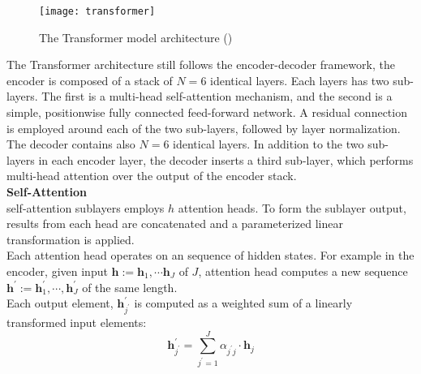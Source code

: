 \begin{figure}[t]
	\centering
	\texttt{[image: transformer]}
	\caption{The Transformer model architecture (\cite{vaswani2017attention})}
\end{figure}
The Transformer architecture still follows the encoder-decoder framework, the encoder is composed of a stack of $N=6$ identical layers. Each layers has two sub-layers. The first is a multi-head self-attention mechanism, and the second is a simple, positionwise fully connected feed-forward network. A residual connection is employed around each of the two sub-layers, followed by layer normalization. The decoder contains also $N=6$ identical layers. In addition to the two sub-layers in each encoder layer, the decoder inserts a third sub-layer, which performs multi-head attention over the output of the encoder stack.\\
%
%
\textbf{Self-Attention}\\
self-attention sublayers employs $h$ attention heads. To form the sublayer output, results from each head are concatenated and a parameterized linear transformation is applied.\\
Each attention head operates on an sequence of hidden states. For example in the encoder, given input $\bm{h}:=\bm{h}_1, \cdots \bm{h}_J$ of $J$, attention head computes a new sequence $\bm{h}^{\prime}:= \bm{h}_1^{\prime}, \cdots, \bm{h}_J^{\prime}$ of the same length.\\
Each output element, $\bm{h}_{j^{\prime}}^{\prime}$ is computed as a weighted sum of a linearly transformed input elements:
\[ \bm{h}_{j^{\prime}}^{\prime} = \sum_{{j^{\prime}}=1}^{J} \alpha_{{j^{\prime}}j}\cdot \bm{h}_{j} \]


